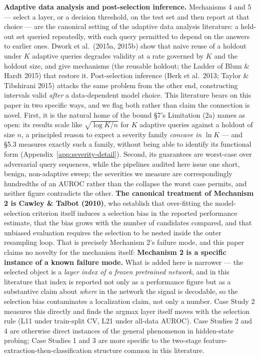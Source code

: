 \documentclass[10pt]{article} %
\begin{document}
\textbf{Adaptive data analysis and post-selection inference.} Mechanisms 4 and
5 --- select a layer, or a decision threshold, on the test set and then report
at that choice --- are the canonical setting of the adaptive data analysis
literature: a held-out set queried repeatedly, with each query permitted to
depend on the answers to earlier ones. Dwork et al.\ (2015a, 2015b) show that
naive reuse of a holdout under $K$ adaptive queries degrades validity at a rate
governed by $K$ and the holdout size, and give mechanisms (the reusable
holdout; the Ladder of Blum \& Hardt 2015) that restore it. Post-selection
inference (Berk et al.\ 2013; Taylor \& Tibshirani 2015) attacks the same
problem from the other end, constructing intervals valid \emph{after} a
data-dependent model choice. This literature bears on this paper in two specific ways, and we flag both
rather than claim the connection is novel. First, it is the natural home of the
bound §7's Limitation (2a) names as open: its results scale like $\sqrt{\log
K/n}$ for $K$ adaptive queries against a holdout of size $n$, a principled
reason to expect a severity family \emph{concave in} $\ln K$ --- and §5.3
measures exactly such a family, without being able to identify its functional
form (Appendix~\ref{app:severity-detail}). Second, its guarantees are worst-case over
adversarial query sequences, while the pipelines audited here issue one short,
benign, non-adaptive sweep; the severities we measure are correspondingly
hundredths of an AUROC rather than the collapse the worst case permits, and
neither figure contradicts the other.
\textbf{The canonical treatment of
Mechanism 2 is Cawley \& Talbot (2010)}, who establish that over-fitting the
model-selection criterion itself induces a selection bias in the reported
performance estimate, that the bias grows with the number of candidates
compared, and that unbiased evaluation requires the selection to be nested
inside the outer resampling loop. That is precisely Mechanism 2's failure mode,
and this paper claims no novelty for the mechanism itself: \textbf{Mechanism 2
is a specific instance of a known failure mode.} What is added here is narrower
--- the selected object is a \emph{layer index of a frozen pretrained network},
and in this literature that index is reported not only as a performance figure
but as a substantive claim about \emph{where} in the network the signal is
decodable, so the selection bias contaminates a localization claim, not only a
number. Case Study 2 measures this directly and finds the argmax layer itself
moves with the selection rule (L11 under train-split CV, L21 under all-data
AUROC). Case Studies 2 and 4 are otherwise direct instances of the general
phenomenon in hidden-state probing; Case Studies 1 and 3 are more specific to
the two-stage feature-extraction-then-classification structure common in this
literature.
\end{document}
